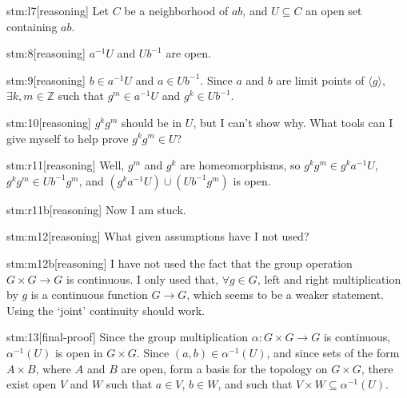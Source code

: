 \begin{stm}{stm:l7}[reasoning]
Let $C$ be a neighborhood of $ab$, and $U \subseteq C$ an open set containing $ab$.
\end{stm}

\begin{stm}{stm:8}[reasoning]
$a^{-1}U$ and $Ub^{-1}$ are open.
\end{stm}

\begin{stm}{stm:9}[reasoning]
$b \in a^{-1}U$ and $a \in Ub^{-1}$. Since $a$ and $b$ are limit points of ${\langle g \rangle}$, $\exists k, m \in \mathbb{Z}$ such that $g^m \in a^{-1}U$ and $g^k \in Ub^{-1}$.
\end{stm}

\begin{stm}{stm:10}[reasoning]
$g^k g^m$ should be in $U$, but I can't show why. What tools can I give myself to help prove $g^k g^m \in U$?
\end{stm}

\begin{stm}{stm:r11}[reasoning]
Well, $g^m$ and $g^k$ are homeomorphisms, so $g^k g^m \in g^k a^{-1}U$, $g^k g^m \in Ub^{-1} g^m$, and $(g^k a^{-1}U) \cup (Ub^{-1} g^m)$ is open.
\end{stm}

\begin{stm}{stm:r11b}[reasoning]
Now I am stuck.
\end{stm}

\begin{stm}{stm:m12}[reasoning]
What given assumptions have I not used? 
\end{stm}

\begin{stm}{stm:m12b}[reasoning]
I have not used the fact that the group operation $G \times G \to G$ is continuous. I only used that, $\forall g \in G$, left and right multiplication by $g$ is a continuous function $G \to G$, which seems to be a weaker statement. Using the ‘joint’ continuity should work.
\end{stm}

\begin{stm}{stm:13}[final-proof]
Since the group multiplication $\alpha: G \times G \to G$ is continuous, $\alpha^{-1}(U)$ is open in $G \times G$. Since $(a,b) \in \alpha^{-1}(U)$, and since sets of the form $A \times B$, where $A$ and $B$ are open, form a basis for the topology on $G \times G$, there exist open $V$ and $W$ such that $a \in V$, $b \in W$, and such that $V \times W \subseteq \alpha^{-1}(U)$.
\end{stm}

